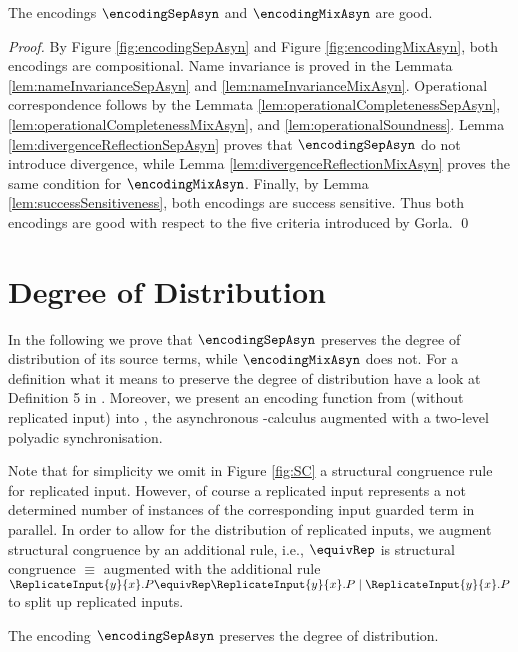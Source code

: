 \documentclass[]{llncs}
\begin{document}
\begin{theorem}
	The encodings $ \encodingSepAsyn $ and $ \encodingMixAsyn $ are good.
\end{theorem}

\begin{proof}
	By Figure \ref{fig:encodingSepAsyn} and Figure \ref{fig:encodingMixAsyn}, both encodings are compositional. Name invariance is proved in the Lemmata \ref{lem:nameInvarianceSepAsyn} and \ref{lem:nameInvarianceMixAsyn}. Operational correspondence follows by the Lemmata \ref{lem:operationalCompletenessSepAsyn}, \ref{lem:operationalCompletenessMixAsyn}, and \ref{lem:operationalSoundness}. Lemma \ref{lem:divergenceReflectionSepAsyn} proves that $ \encodingSepAsyn $ do not introduce divergence, while Lemma \ref{lem:divergenceReflectionMixAsyn} proves the same condition for $ \encodingMixAsyn $. Finally, by Lemma \ref{lem:successSensitiveness}, both encodings are success sensitive. Thus both encodings are good with respect to the five criteria introduced by Gorla.
	\qed
\end{proof}

\section{Degree of Distribution} \label{sec:proofsDistributability}

In the following we prove that $ \encodingSepAsyn $ preserves the degree of distribution of its source terms, while $ \encodingMixAsyn $ does not. For a definition what it means to preserve the degree of distribution have a look at Definition 5 in \cite{petersNestmann12}. Moreover, we present an encoding function from \piMix (without replicated input) into \piAsynTwo, the asynchronous \piCal-calculus augmented with a two-level polyadic synchronisation.

Note that for simplicity we omit in Figure \ref{fig:SC} a structural congruence rule for replicated input. However, of course a replicated input represents a not determined number of instances of the corresponding input guarded term in parallel. In order to allow for the distribution of replicated inputs, we augment structural congruence by an additional rule, i.e., $ \equivRep $ is structural congruence $ \equiv $ augmented with the additional rule $ \ReplicateInput{y}{x}.P \equivRep \ReplicateInput{y}{x}.P \mid \ReplicateInput{y}{x}.P $ to split up replicated inputs.

\begin{lemma}
	The encoding $ \encodingSepAsyn $ preserves the degree of distribution.
\end{lemma}
\end{document}
